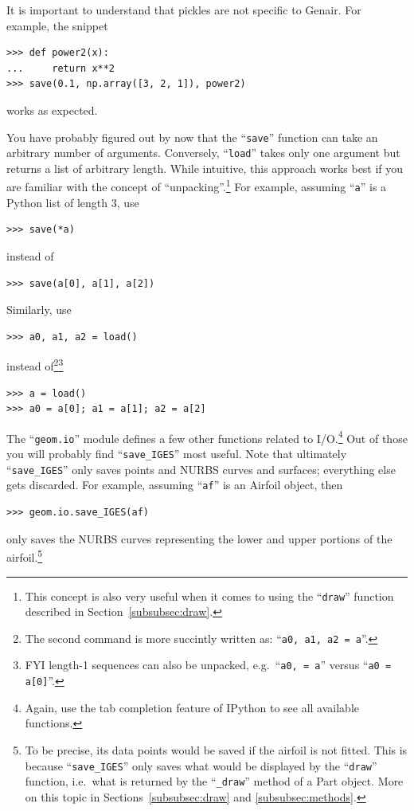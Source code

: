 \documentclass[]{article}
\begin{document}
It is important to understand that pickles are not specific to Genair.  
For example, the snippet
\begin{verbatim}
>>> def power2(x):
...     return x**2
>>> save(0.1, np.array([3, 2, 1]), power2)
\end{verbatim}
works as expected.

You have probably figured out by now that the ``\texttt{save}'' function 
can take an arbitrary number of arguments.  Conversely, 
``\texttt{load}'' takes only one argument but returns a list of 
arbitrary length.  While intuitive, this approach works best if you are 
familiar with the concept of ``unpacking''.\footnote{This concept is 
also very useful when it comes to using the ``\texttt{draw}'' function 
described in Section~\ref{subsubsec:draw}.}  For example, assuming 
``\texttt{a}'' is a Python list of length 3, use
\begin{verbatim}
>>> save(*a)
\end{verbatim}
instead of
\begin{verbatim}
>>> save(a[0], a[1], a[2])
\end{verbatim}
Similarly, use
\begin{verbatim}
>>> a0, a1, a2 = load()
\end{verbatim}
instead of\footnote{The second command is more succintly written as: 
``\texttt{a0, a1, a2 = a}''.}\footnote{FYI length-1 sequences can also 
be unpacked, e.g.\ ``\texttt{a0, = a}'' versus ``\texttt{a0 = a[0]}''.}
\begin{verbatim}
>>> a = load()
>>> a0 = a[0]; a1 = a[1]; a2 = a[2]
\end{verbatim}

The ``\texttt{geom.io}'' module defines a few other functions related to 
I/O.\footnote{Again, use the tab completion feature of IPython to see 
all available functions.}  Out of those you will probably find 
``\texttt{save\_IGES}'' most useful.  Note that ultimately 
``\texttt{save\_IGES}'' only saves points and NURBS curves and surfaces; 
everything else gets discarded.  For example, assuming ``\texttt{af}'' 
is an Airfoil object, then
\begin{verbatim}
>>> geom.io.save_IGES(af)
\end{verbatim}
only saves the NURBS curves representing the lower and upper portions of 
the airfoil.\footnote{To be precise, its data points would be saved if 
the airfoil is not fitted.  This is because ``\texttt{save\_IGES}'' only 
saves what would be displayed by the ``\texttt{draw}'' function, i.e.\ 
what is returned by the ``\texttt{\_draw}'' method of a Part object.  
More on this topic in Sections~\ref{subsubsec:draw} and 
\ref{subsubsec:methods}.}
\end{document}
